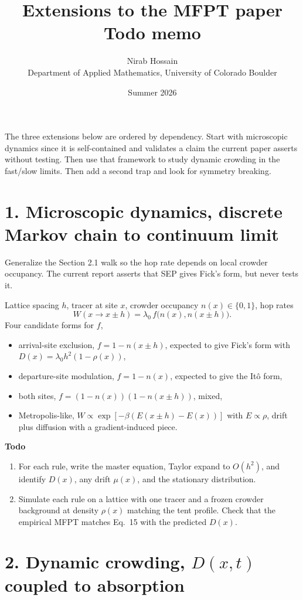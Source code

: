 \documentclass[11pt]{article}
\title{\textbf{Extensions to the MFPT paper}\\[4pt]
\large Todo memo}
\author{Nirab Hossain\\[2pt]\small Department of Applied Mathematics, University of Colorado Boulder}
\date{Summer 2026}
\begin{document}
\maketitle

The three extensions below are ordered by dependency. Start with microscopic dynamics since it is self-contained and validates a claim the current paper asserts without testing. Then use that framework to study dynamic crowding in the fast/slow limits. Then add a second trap and look for symmetry breaking.

\section*{1. Microscopic dynamics, discrete Markov chain to continuum limit}

Generalize the Section 2.1 walk so the hop rate depends on local crowder occupancy. The current report asserts that SEP gives Fick's form, but never tests it.

Lattice spacing $h$, tracer at site $x$, crowder occupancy $n(x) \in \{0,1\}$, hop rates
\[
W(x \to x \pm h) = \lambda_0 \, f\!\big(n(x), n(x\pm h)\big).
\]
Four candidate forms for $f$,
\begin{itemize}
  \item arrival-site exclusion, $f = 1 - n(x \pm h)$, expected to give Fick's form with $D(x) = \lambda_0 h^2 (1-\rho(x))$,
  \item departure-site modulation, $f = 1 - n(x)$, expected to give the It\^o form,
  \item both sites, $f = (1-n(x))(1-n(x\pm h))$, mixed,
  \item Metropolis-like, $W \propto \exp[-\beta(E(x\pm h) - E(x))]$ with $E \propto \rho$, drift plus diffusion with a gradient-induced piece.
\end{itemize}

\textbf{Todo}
\begin{enumerate}
  \item For each rule, write the master equation, Taylor expand to $O(h^2)$, and identify $D(x)$, any drift $\mu(x)$, and the stationary distribution.
  \item Simulate each rule on a lattice with one tracer and a frozen crowder background at density $\rho(x)$ matching the tent profile. Check that the empirical MFPT matches Eq.~15 with the predicted $D(x)$.
\end{enumerate}

\section*{2. Dynamic crowding, $D(x,t)$ coupled to absorption}
\end{document}
